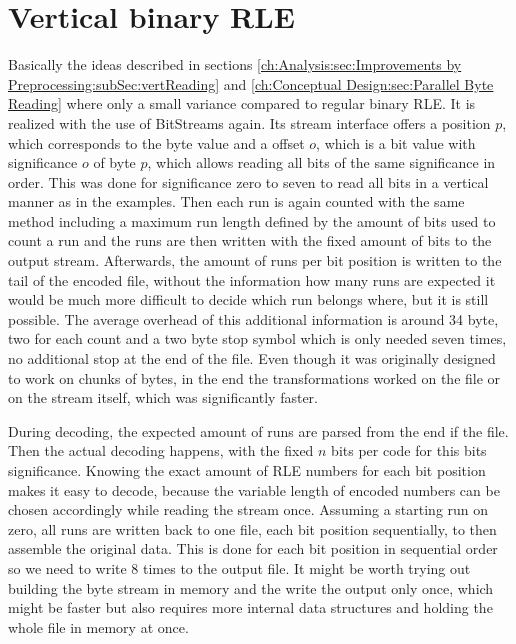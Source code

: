 \section{Vertical binary RLE}
\label{ch:Implementation:vertical rle}
\par{
	Basically the ideas described in sections \ref{ch:Analysis:sec:Improvements by Preprocessing:subSec:vertReading} and \ref{ch:Conceptual Design:sec:Parallel Byte Reading} where only a small variance compared to regular binary RLE. It is realized with the use of BitStreams again. Its stream interface offers a position $p$, which corresponds to the byte value and a offset $o$, which is a bit value with significance $o$ of byte $p$, which allows reading all bits of the same significance in order. This was done for significance zero to seven to read all bits in a vertical manner as in the examples. Then each run is again counted with the same method including a maximum run length defined by the amount of bits used to count a run and the runs are then written with the fixed amount of bits to the output stream. Afterwards, the amount of runs per bit position is written to the tail of the encoded file, without the information how many runs are expected it would be much more difficult to decide which run belongs where, but it is still possible. The average overhead of this additional information is around 34 byte, two for each count and a two byte stop symbol which is only needed seven times, no additional stop at the end of the file. Even though it was originally designed to work on chunks of bytes, in the end the transformations worked on the file or on the stream itself, which was significantly faster.
}
\par{
	During decoding, the expected amount of runs are parsed from the end if the file. Then the actual decoding happens, with the fixed $n$ bits per code for this bits significance. Knowing the exact amount of RLE numbers for each bit position makes it easy to decode, because the variable length of encoded numbers can be chosen accordingly while reading the stream once. Assuming a starting run on zero, all runs are written back to one file, each bit position sequentially, to then assemble the original data. This is done for each bit position in sequential order so we need to write 8 times to the output file. It might be worth trying out building the byte stream in memory and the write the output only once, which might be faster but also requires more internal data structures and holding the whole file in memory at once.
}
